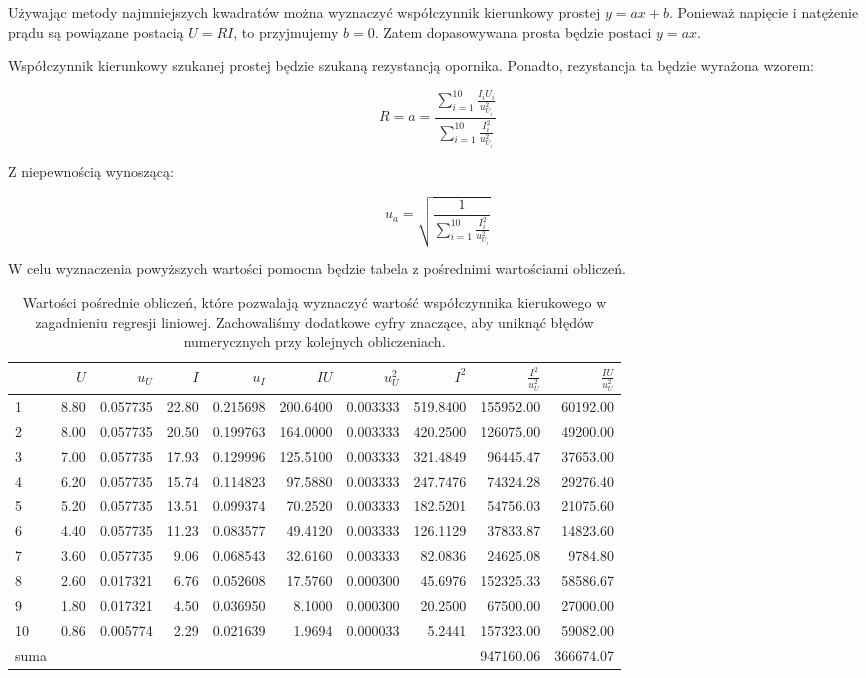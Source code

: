 \documentclass[a4paper]{article}
\begin{document}
Używając metody najmniejszych kwadratów można wyznaczyć współczynnik kierunkowy prostej $y = ax + b$.
Ponieważ napięcie i natężenie prądu są powiązane postacią $U = RI$, to przyjmujemy $b = 0$.
Zatem dopasowywana prosta będzie postaci $y = ax$.

Współczynnik kierunkowy szukanej prostej będzie szukaną rezystancją opornika. Ponadto, rezystancja ta będzie wyrażona wzorem:

$$R = a = \frac{\sum_{i = 1}^{10}\frac{I_i U_i}{u_{U_i}^2}}{\sum_{i = 1}^{10}\frac{I_i^2}{u_{U_i}^2}}$$

Z niepewnością wynoszącą:

$$u_a = \sqrt{\frac{1}{\sum_{i = 1}^{10}\frac{I_i^2}{u_{U_i}^2}}}$$

W celu wyznaczenia powyższych wartości pomocna będzie tabela z pośrednimi wartościami obliczeń.

\begin{table}
\centering
\begin{tabular}{lrrrrrrrrr}
\toprule
{} &     $U$ &       $u_U$ &      $I$ &       $u_I$ &       $IU$ &     $u_U^2$ &       $I^2$ &    $\frac{I^2}{u_U^2}$ & $\frac{IU}{u_U^2}$ \\
\midrule
1 &  8.80 &  0.057735 &  22.80 &  0.215698 &  200.6400 &  0.003333 &  519.8400 &  155952.00 &  60192.00 \\
2 &  8.00 &  0.057735 &  20.50 &  0.199763 &  164.0000 &  0.003333 &  420.2500 &  126075.00 &  49200.00 \\
3 &  7.00 &  0.057735 &  17.93 &  0.129996 &  125.5100 &  0.003333 &  321.4849 &   96445.47 &  37653.00 \\
4 &  6.20 &  0.057735 &  15.74 &  0.114823 &   97.5880 &  0.003333 &  247.7476 &   74324.28 &  29276.40 \\
5 &  5.20 &  0.057735 &  13.51 &  0.099374 &   70.2520 &  0.003333 &  182.5201 &   54756.03 &  21075.60 \\
6 &  4.40 &  0.057735 &  11.23 &  0.083577 &   49.4120 &  0.003333 &  126.1129 &   37833.87 &  14823.60 \\
7 &  3.60 &  0.057735 &   9.06 &  0.068543 &   32.6160 &  0.003333 &   82.0836 &   24625.08 &   9784.80 \\
8 &  2.60 &  0.017321 &   6.76 &  0.052608 &   17.5760 &  0.000300 &   45.6976 &  152325.33 &  58586.67 \\
9 &  1.80 &  0.017321 &   4.50 &  0.036950 &    8.1000 &  0.000300 &   20.2500 &   67500.00 &  27000.00 \\
10 &  0.86 &  0.005774 &   2.29 &  0.021639 &    1.9694 &  0.000033 &    5.2441 &  157323.00 &  59082.00 \\
\midrule
	suma & {} & {} & {} & {} & {} & {} & {} & 947160.06 & 366674.07 \\
\bottomrule
\end{tabular}
\caption{Wartości pośrednie obliczeń, które pozwalają wyznaczyć wartość współczynnika kierukowego w zagadnieniu regresji liniowej. Zachowaliśmy dodatkowe cyfry znaczące, aby uniknąć błędów numerycznych przy kolejnych obliczeniach.}
\end{table}
\end{document}
